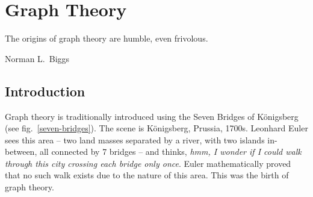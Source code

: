 \documentclass[main.tex]{subfiles}
\begin{document}
\chapter{Graph Theory}

\epigraph{The origins of graph theory are humble, even frivolous.}{Norman L.\ Biggs}

\minitoc

\section{Introduction}

Graph theory is traditionally introduced using the Seven Bridges of K\"onigsberg (see fig.\ \ref{seven-bridges}). The scene is K\"onigsberg, Prussia, 1700s. Leonhard Euler sees this area -- two land masses separated by a river, with two islands in-between, all connected by 7 bridges -- and thinks, \textit{hmm, I wonder if I could walk through this city crossing each bridge only once}. Euler mathematically proved that no such walk exists due to the nature of this area. This was the birth of graph theory.
\end{document}
